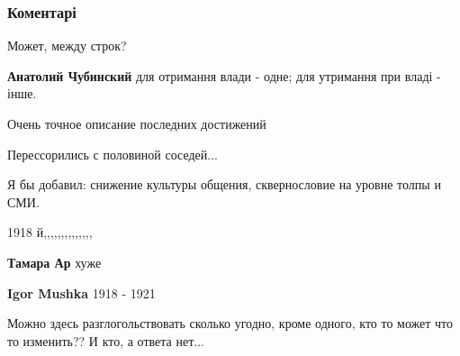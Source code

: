  
 
 
 
 
\subsubsection{Коментарі}

\begin{itemize} %
Может, между строк?

\textbf{Анатолий Чубинский} для отримання влади - одне; для утримання при владі - інше.

Очень точное описание последних достижений

Перессорились с половиной соседей...

Я бы добавил: снижение культуры общения, сквернословие на уровне толпы и СМИ.

1918 й,,,,,,,,,,,,,,

\textbf{Тамара Ар} хуже

\textbf{Igor Mushka} 1918 - 1921


Можно здесь разглогольствовать сколько угодно, кроме одного, кто то может что то
изменить?? И кто, а ответа нет...

\end{itemize} %
